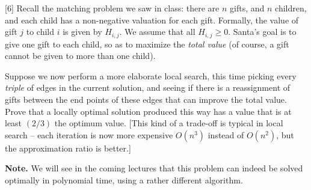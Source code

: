 \documentclass[addpoints, 11pt]{exam}
\begin{document}
\begin{questions}
\begin{parts}
  \end{parts}

  [6]
  Recall the matching problem we saw in class: there are $n$ gifts, and $n$ children, and each child has a non-negative valuation for each gift. Formally, the value of gift $j$ to child $i$ is given by $H_{i,j}$.  We assume that all $H_{i,j} \ge 0$. Santa's goal is to give one gift to each child, so as to maximize the {\em total value} (of course, a gift cannot be given to more than one child).

  Suppose we now perform a more elaborate local search, this time picking every {\em triple} of edges in the current solution, and seeing if there is a reassignment of gifts between the end points of these edges that can improve the total value. Prove that a locally optimal solution produced this way has a value that is at least $(2/3)$ the optimum value. [This kind of a trade-off is typical in local search -- each iteration is now more expensive $O(n^3)$ instead of $O(n^2)$, but the approximation ratio is better.]

    {\bf Note.}  We will see in the coming lectures that this problem can indeed be solved optimally in polynomial time, using a rather different algorithm.

\end{questions}
\end{document}
